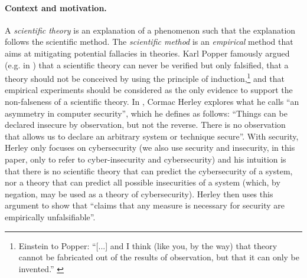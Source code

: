 \documentclass[runningheads]{llncs}
\begin{document}
\paragraph{Context and motivation.}
A \emph{scientific theory} is an explanation of a phenomenon such that the
explanation follows the scientific method. The \emph{scientific method} is an
\emph{empirical} method that aims at mitigating potential fallacies in
theories.  Karl Popper famously argued (e.g. in \autocite{Popper1959logic})
that a scientific theory can never be verified but only falsified, that a
theory should not be conceived by using the principle of
induction,\footnote{Einstein to Popper: ``[...] and I think (like
you, by the way) that theory cannot be fabricated out of the results of
observation, but that it can only be invented.'' \autocite{Popper1959logic}}
and that empirical experiments should be considered as the only evidence to
support the non-falseness of a scientific theory. 
In \autocite{Herley2016unfalsifiability}, Cormac Herley explores what he calls
``an asymmetry in computer security'', which he defines as follows: ``Things
can be declared insecure by observation, but not the reverse. There is no
observation that allows us to declare an arbitrary system or technique
secure''. With security, Herley only focuses on cybersecurity (we also use
security and insecurity, in this paper, only to refer to cyber-insecurity and
cybersecurity) and his intuition is that there is no scientific theory that can
predict the cybersecurity of a system, nor a theory that can predict all
possible insecurities of a system (which, by negation, may be used as a theory
of cybersecurity).  Herley then uses this argument to show that ``claims that
any measure is necessary for security are empirically unfalsifiable''. 
\end{document}
